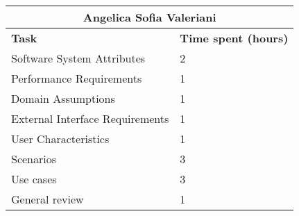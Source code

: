 \begin{table}[h]
  \center
  \begin{tabular}{l|l}
    \multicolumn{2}{c}{\textbf{Angelica Sofia Valeriani}} \\
    \hline
    \textbf{Task} & \textbf{Time spent (hours)}\\
    \hline
    Software System Attributes & 2 \\
    Performance Requirements & 1 \\
    Domain Assumptions & 1 \\
    External Interface Requirements & 1 \\
    User Characteristics & 1 \\
    Scenarios & 3 \\
    Use cases & 3 \\
    General review & 1 \\
  \end{tabular}
\end{table}